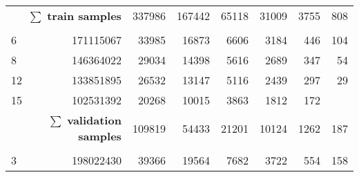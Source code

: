 \begin{table}[hbp]
\begin{tabular}{lrrrrrrr}
\multicolumn{2}{r}{$\mathbf{\sum}$ \textbf{train samples}}                                                                         & 337986                 & 167442                  & 65118                   & 31009                   & 3755                     & 808                      \\
                                                         &                                                         &                        &                         &                         &                         &                          &                          \\
6                                                        & 171115067                                               & 33985                  & 16873                   & 6606                    & 3184                    & 446                      & 104                      \\
8                                                        & 146364022                                               & 29034                  & 14398                   & 5616                    & 2689                    & 347                      & 54                       \\
12                                                       & 133851895                                               & 26532                  & 13147                   & 5116                    & 2439                    & 297                      & 29                       \\
15                                                       & 102531392                                               & 20268                  & 10015                   & 3863                    & 1812                    & 172                      &                          \\
\multicolumn{2}{r}{$\mathbf{\sum}$ \textbf{validation samples}}                                                                    & 109819                 & 54433                   & 21201                   & 10124                   & 1262                     & 187                      \\
                                                         &                                                         &                        &                         &                         &                         &                          &                          \\
3                                                        & 198022430                                               & 39366                  & 19564                   & 7682                    & 3722                    & 554                      & 158                      \\

\end{tabular}
\end{table}
